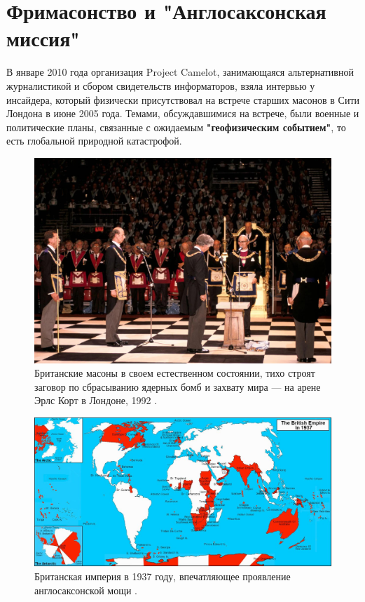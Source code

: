 \documentclass[10pt,twocolumn,letterpaper]{article}
\begin{document}
\section{Фримасонство и "Англосаксонская миссия"}

В январе 2010 года организация Project Camelot, занимающаяся альтернативной журналистикой и сбором свидетельств информаторов, взяла интервью \cite{4,6} у инсайдера, который физически присутствовал на встрече старших масонов в Сити Лондона в июне 2005 года. Темами, обсуждавшимися на встрече, были военные и политические планы, связанные с ожидаемым \textbf{"геофизическим событием"}, то есть глобальной природной катастрофой.

\begin{figure}[b]
\begin{center}
\includegraphics[width=1\linewidth]{freemason.jpg}
\end{center}
   \caption{Британские масоны в своем естественном состоянии, тихо строят заговор по сбрасыванию ядерных бомб и захвату мира — на арене Эрлс Корт в Лондоне, 1992 \cite{5}.}
\label{fig:1}
\label{fig:onecol}
\end{figure}

\begin{figure}[t]
\begin{center}
\includegraphics[width=1\textwidth]{british.jpg}
\end{center}
   \caption{Британская империя в 1937 году, впечатляющее проявление англосаксонской мощи \cite{14}.}
   \label{fig:2}
\end{figure}
\end{document}
